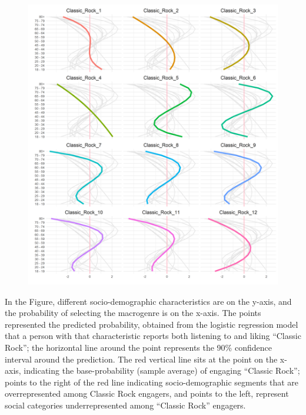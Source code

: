 \documentclass[a4paper,12pt]{extarticle}
\begin{document}
\begin{figure}[ht!]
    \centering
    \includegraphics[width=1.0\textwidth]{Figs/Link Clust/classic-rock-age.png}
    \caption{}
    \label{fig:age}
\end{figure}
 
In the Figure, different socio-demographic characteristics are on the y-axis, and the probability of selecting the macrogenre is on the x-axis. The points represented the predicted probability, obtained from the logistic regression model that a person with that characteristic reports both listening to and liking ``Classic Rock''; the horizontal line around the point represents the 90\% confidence interval around the prediction. The red vertical line sits at the point on the x-axis, indicating the base-probability (sample average) of engaging ``Classic Rock''; points to the right of the red line indicating socio-demographic segments that are overrepresented among Classic Rock engagers, and points to the left, represent social categories underrepresented among ``Classic Rock'' engagers. 
\end{document}
